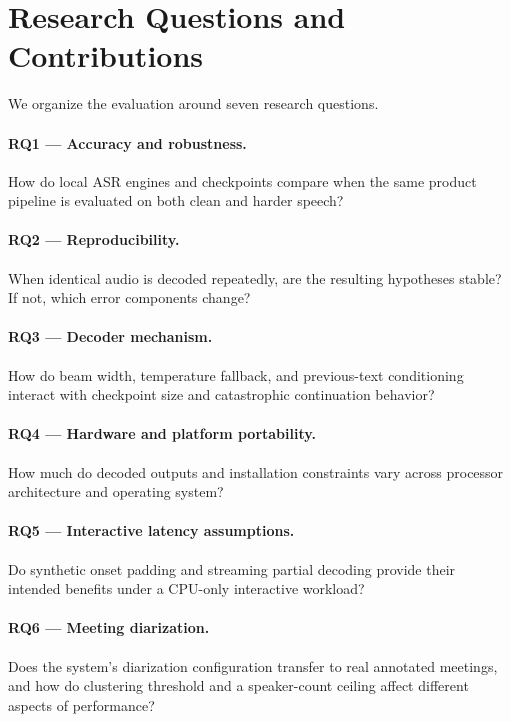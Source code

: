 \section{Research Questions and Contributions}

We organize the evaluation around seven research questions.

\paragraph{RQ1 --- Accuracy and robustness.}
How do local ASR engines and checkpoints compare when the same product pipeline is evaluated on
both clean and harder speech?

\paragraph{RQ2 --- Reproducibility.}
When identical audio is decoded repeatedly, are the resulting hypotheses stable? If not, which
error components change?

\paragraph{RQ3 --- Decoder mechanism.}
How do beam width, temperature fallback, and previous-text conditioning interact with checkpoint
size and catastrophic continuation behavior?

\paragraph{RQ4 --- Hardware and platform portability.}
How much do decoded outputs and installation constraints vary across processor architecture and
operating system?

\paragraph{RQ5 --- Interactive latency assumptions.}
Do synthetic onset padding and streaming partial decoding provide their intended benefits under a
CPU-only interactive workload?

\paragraph{RQ6 --- Meeting diarization.}
Does the system's diarization configuration transfer to real annotated meetings, and how do
clustering threshold and a speaker-count ceiling affect different aspects of performance?

